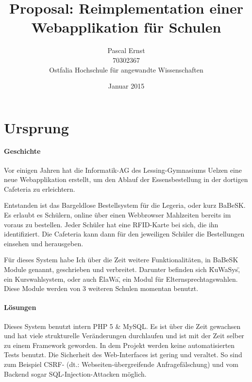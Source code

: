 \documentclass[a4paper,10pt]{scrartcl}
\begin{document}
\title{Proposal: Reimplementation einer Webapplikation für Schulen}
\author{Pascal Ernst\\
  70302367 \\
  Ostfalia Hochschule für angewandte Wissenschaften}
\date{Januar 2015}
\maketitle

\newpage

\section{Ursprung}

  \paragraph{Geschichte}
    Vor einigen Jahren hat die Informatik-AG des Lessing-Gymnasiums Uelzen eine
    neue Webapplikation erstellt, um den Ablauf der Essensbestellung in der
    dortigen Cafeteria zu erleichtern.

    Entstanden ist das Bargeldlose Bestellsystem für die Legeria, oder kurz
    BaBeSK.
    Es erlaubt es Schülern, online über einen Webbrowser Mahlzeiten bereits im
    voraus zu bestellen.
    Jeder Schüler hat eine RFID-Karte bei sich, die ihn identifiziert.
    Die Cafeteria kann dann für den jeweiligen Schüler die Bestellungen einsehen
    und herausgeben.

    Für dieses System habe Ich über die Zeit weitere Funktionalitäten, in BaBeSK
    Module genannt, geschrieben und verbreitet.
    Darunter befinden sich \"KuWaSys\", ein Kurswahlsystem, oder auch \"ElaWa\",
    ein Modul für Elternsprechtagswahlen.
    Diese Module werden von 3 weiteren Schulen momentan benutzt.

  \paragraph{Lösungen}
    Dieses System benutzt intern PHP 5 \& MySQL.
    Es ist über die Zeit gewachsen und hat viele strukturelle Veränderungen
    durchlaufen und ist mit der Zeit selber zu einem Framework geworden.
    In dem Projekt werden keine automatisierten Tests benutzt.
    Die Sicherheit des Web-Interfaces ist gering und veraltet.
    So sind zum Beispiel CSRF- (dt.: Webseiten-übergreifende
    Anfragefälschung) und vom Backend sogar SQL-Injection-Attacken möglich.
\end{document}

